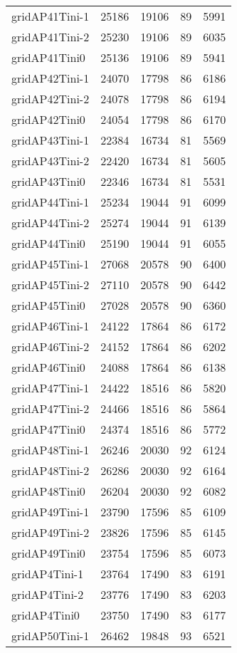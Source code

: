 \begin{longtable}{lrrrr}
gridAP41Tini-1 & 25186 & 19106 & 89 & 5991 \\
gridAP41Tini-2 & 25230 & 19106 & 89 & 6035 \\
gridAP41Tini0 & 25136 & 19106 & 89 & 5941 \\
gridAP42Tini-1 & 24070 & 17798 & 86 & 6186 \\
gridAP42Tini-2 & 24078 & 17798 & 86 & 6194 \\
gridAP42Tini0 & 24054 & 17798 & 86 & 6170 \\
gridAP43Tini-1 & 22384 & 16734 & 81 & 5569 \\
gridAP43Tini-2 & 22420 & 16734 & 81 & 5605 \\
gridAP43Tini0 & 22346 & 16734 & 81 & 5531 \\
gridAP44Tini-1 & 25234 & 19044 & 91 & 6099 \\
gridAP44Tini-2 & 25274 & 19044 & 91 & 6139 \\
gridAP44Tini0 & 25190 & 19044 & 91 & 6055 \\
gridAP45Tini-1 & 27068 & 20578 & 90 & 6400 \\
gridAP45Tini-2 & 27110 & 20578 & 90 & 6442 \\
gridAP45Tini0 & 27028 & 20578 & 90 & 6360 \\
gridAP46Tini-1 & 24122 & 17864 & 86 & 6172 \\
gridAP46Tini-2 & 24152 & 17864 & 86 & 6202 \\
gridAP46Tini0 & 24088 & 17864 & 86 & 6138 \\
gridAP47Tini-1 & 24422 & 18516 & 86 & 5820 \\
gridAP47Tini-2 & 24466 & 18516 & 86 & 5864 \\
gridAP47Tini0 & 24374 & 18516 & 86 & 5772 \\
gridAP48Tini-1 & 26246 & 20030 & 92 & 6124 \\
gridAP48Tini-2 & 26286 & 20030 & 92 & 6164 \\
gridAP48Tini0 & 26204 & 20030 & 92 & 6082 \\
gridAP49Tini-1 & 23790 & 17596 & 85 & 6109 \\
gridAP49Tini-2 & 23826 & 17596 & 85 & 6145 \\
gridAP49Tini0 & 23754 & 17596 & 85 & 6073 \\
gridAP4Tini-1 & 23764 & 17490 & 83 & 6191 \\
gridAP4Tini-2 & 23776 & 17490 & 83 & 6203 \\
gridAP4Tini0 & 23750 & 17490 & 83 & 6177 \\
gridAP50Tini-1 & 26462 & 19848 & 93 & 6521 \\

\end{longtable}
